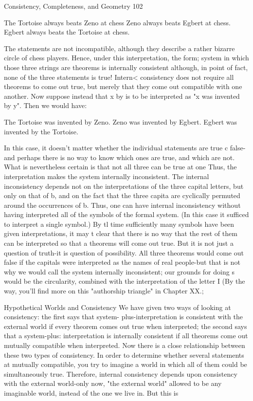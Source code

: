 Consistency, Completeness, and Geometry                                                 102

       The Tortoise always beats Zeno at chess
       Zeno always beats Egbert at chess.
       Egbert always beats the Tortoise at chess.

The statements are not incompatible, although they describe a rather bizarre circle of
chess players. Hence, under this interpretation, the form; system in which those three
strings are theorems is internally consistent although, in point of fact, none of the three
statements is true! Intern< consistency does not require all theorems to come out true, but
merely that they come out compatible with one another.
        Now suppose instead that x by is to be interpreted as "x was invented by y". Then
we would have:

       The Tortoise was invented by Zeno.
       Zeno was invented by Egbert.
       Egbert was invented by the Tortoise.

In this case, it doesn't matter whether the individual statements are true c false-and
perhaps there is no way to know which ones are true, and which are not. What is
nevertheless certain is that not all three can be true at one Thus, the interpretation makes
the system internally inconsistent. The internal inconsistency depends not on the
interpretations of the three capital letters, but only on that of b, and on the fact that the
three capita are cyclically permuted around the occurrences of b. Thus, one can have
internal inconsistency without having interpreted all of the symbols of the formal system.
(In this case it sufficed to interpret a single symbol.) By tl time sufficiently many symbols
have been given interpretations, it may t clear that there is no way that the rest of them
can be interpreted so that a theorems will come out true. But it is not just a question of
truth-it is question of possibility. All three theorems would come out false if the capitals
were interpreted as the names of real people-but that is not why we would call the system
internally inconsistent; our grounds for doing s would be the circularity, combined with
the interpretation of the letter I (By the way, you'll find more on this "authorship triangle"
in Chapter XX.;

                      Hypothetical Worlds and Consistency
        We have given two ways of looking at consistency: the first says that system-
plus-interpretation is consistent with the external world if every theorem comes out true
when interpreted; the second says that a system-plus: interpretation is internally
consistent if all theorems come out mutually compatible when interpreted. Now there is a
close relationship between these two types of consistency. In order to determine whether
several statements at mutually compatible, you try to imagine a world in which all of
them could be simultaneously true. Therefore, internal consistency depends upon
consistency with the external world-only now, "the external world" allowed to be any
imaginable world, instead of the one we live in. But this is





